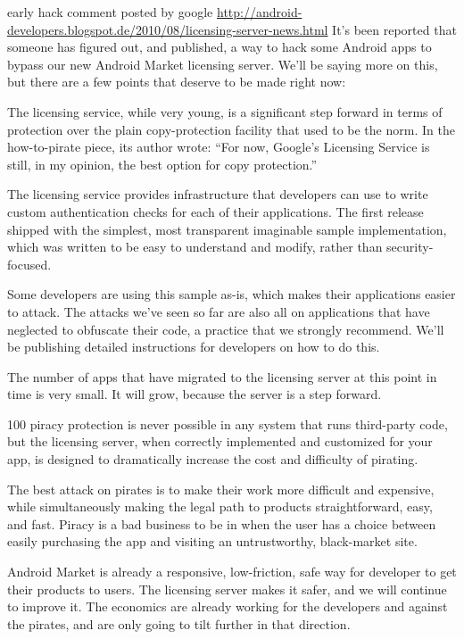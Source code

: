early hack comment posted by google \url{http://android-developers.blogspot.de/2010/08/licensing-server-news.html}
\newline
It’s been reported that someone has figured out, and published, a way to hack some Android apps to bypass our new Android Market licensing server. We’ll be saying more on this, but there are a few points that deserve to be made right now:

The licensing service, while very young, is a significant step forward in terms of protection over the plain copy-protection facility that used to be the norm. In the how-to-pirate piece, its author wrote: “For now, Google’s Licensing Service is still, in my opinion, the best option for copy protection.”

The licensing service provides infrastructure that developers can use to write custom authentication checks for each of their applications. The first release shipped with the simplest, most transparent imaginable sample implementation, which was written to be easy to understand and modify, rather than security-focused.

Some developers are using this sample as-is, which makes their applications easier to attack. The attacks we’ve seen so far are also all on applications that have neglected to obfuscate their code, a practice that we strongly recommend. We’ll be publishing detailed instructions for developers on how to do this.

The number of apps that have migrated to the licensing server at this point in time is very small. It will grow, because the server is a step forward.

100 piracy protection is never possible in any system that runs third-party code, but the licensing server, when correctly implemented and customized for your app, is designed to dramatically increase the cost and difficulty of pirating.

The best attack on pirates is to make their work more difficult and expensive, while simultaneously making the legal path to products straightforward, easy, and fast. Piracy is a bad business to be in when the user has a choice between easily purchasing the app and visiting an untrustworthy, black-market site.

Android Market is already a responsive, low-friction, safe way for developer to get their products to users. The licensing server makes it safer, and we will continue to improve it. The economics are already working for the developers and against the pirates, and are only going to tilt further in that direction.
\newline
